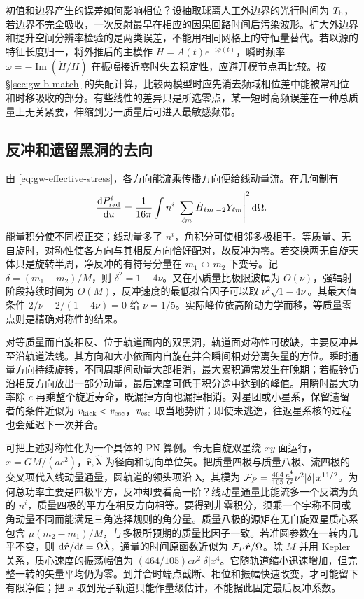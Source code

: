 初值和边界产生的误差如何影响相位？设抽取球离人工外边界的光行时间为 $T_{\rm b}$，若边界不完全吸收，一次反射最早在相应的因果回路时间后污染波形。扩大外边界和提升空间分辨率检验的是两类误差，不能用相同网格上的守恒量替代。若以源的特征长度归一，将外推后的主模作 $H=A(t)e^{-\mathrm i\phi(t)}$，瞬时频率 $\omega=-\operatorname{Im}(\dot H/H)$ 在振幅接近零时失去稳定性，应避开模节点再比较。按 \S\ref{sec:gw-b-match} 的失配计算，比较两模型时应先消去频域相位差中能被常相位和时移吸收的部分。有些线性的差异只是所选零点，某一短时高频误差在一种总质量上无关紧要，伸缩到另一质量后可进入最敏感频带。

\subsection{反冲和遗留黑洞的去向}

由 \eqref{eq:gw-effective-stress}，各方向能流乘传播方向便给线动量流。在几何制有
\[
 \frac{\dd P^i_{\rm rad}}{\dd u}
 =\frac1{16\pi}\int n^i\left|
       \sum_{\ell m}\dot H_{\ell m}\,{}_{-2}Y_{\ell m}\right|^2\dd\Omega .
\]
能量积分使不同模正交；线动量多了 $n^i$，角积分可使相邻多极相干。等质量、无自旋时，对称性使各方向与其相反方向恰好配对，故反冲为零。若交换两无自旋天体只是旋转半周，净反冲的有符号分量在 $m_1\leftrightarrow m_2$ 下变号。记 $\delta=(m_1-m_2)/M$，则 $\delta^2=1-4\nu$。又在小质量比极限波幅为 $O(\nu)$，强辐射阶段持续时间为 $O(M)$，反冲速度的最低拟合因子可以取 $\nu^2\sqrt{1-4\nu}$。其最大值条件 $2/\nu-2/(1-4\nu)=0$ 给 $\nu=1/5$。实际峰位依高阶动力学而移，等质量零点则是精确对称性的结果。

对等质量而自旋相反、位于轨道面内的双黑洞，轨道面对称性可破缺，主要反冲甚至沿轨道法线。其方向和大小依面内自旋在并合瞬间相对分离矢量的方位。瞬时通量方向持续旋转，不同周期间动量大部相消，最大累积通常发生在晚期；若振铃仍沿相反方向放出一部分动量，最后速度可低于积分途中达到的峰值。用瞬时最大功率除 $c$ 再乘整个旋近寿命，既漏掉方向也漏掉相消。对星团或小星系，保留遗留者的条件近似为 $v_{\rm kick}<v_{\rm esc}$，$v_{\rm esc}$ 取当地势阱；即使未逃逸，往返星系核的过程也会延迟下一次并合。


可把上述对称性化为一个具体的 PN 算例。令无自旋双星绕 $xy$ 面运行，$x=GM/(ac^2)$，$\hat{\bm r},\hat{\bm\lambda}$ 为径向和切向单位矢。把质量四极与质量八极、流四极的交叉项代入线动量通量，圆轨道的领头项沿 $\hat{\bm\lambda}$，其模为 ${\cal F}_P=\frac{464}{105}\frac{c^4}{G} \nu^2|\delta|\,x^{11/2}$。为何总功率主要是四极平方，反冲却要看高一阶？线动量通量比能流多一个反演为负的 $n^i$，质量四极的平方在相反方向相等。要得到非零积分，须乘一个宇称不同或角动量不同而能满足三角选择规则的角分量。质量八极的源矩在无自旋双星质心系包含 $\mu(m_2-m_1)/M$，与多极所预期的质量比因子一致。若准圆参数在一转内几乎不变，则 $\dd\hat{\bm r}/\dd t=\Omega\hat{\bm\lambda}$，通量的时间原函数近似为 ${\cal F}_P\hat{\bm r}/\Omega$。除 $M$ 并用 Kepler 关系，质心速度的振荡幅值为 $(464/105)c\nu^2|\delta|x^4$。它随轨道缩小迅速增加，但完整一转的矢量平均仍为零。到并合时端点截断、相位和振幅快速改变，才可能留下有限净值；把 $x$ 取到光子轨道只能作量级估计，不能据此固定最后反冲系数。

